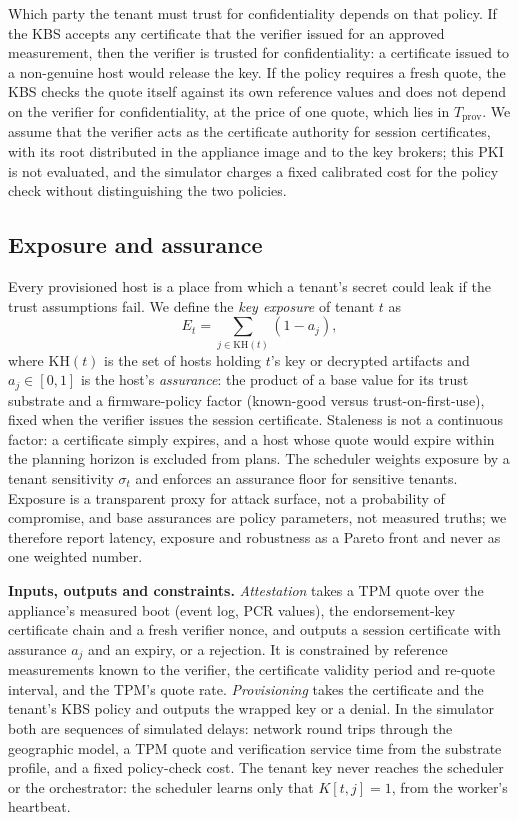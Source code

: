 Which party the tenant must trust for confidentiality depends on that policy. If the KBS accepts any certificate that the verifier issued for an approved measurement, then the verifier is trusted for confidentiality: a certificate issued to a non-genuine host would release the key. If the policy requires a fresh quote, the KBS checks the quote itself against its own reference values and does not depend on the verifier for confidentiality, at the price of one quote, which lies in $T_{\text{prov}}$. We assume that the verifier acts as the certificate authority for session certificates, with its root distributed in the appliance image and to the key brokers; this PKI is not evaluated, and the simulator charges a fixed calibrated cost for the policy check without distinguishing the two policies.

\subsection{Exposure and assurance}
\label{sec:exposure}
Every provisioned host is a place from which a tenant's secret could leak if the trust assumptions fail. We define the \emph{key exposure}
of tenant $t$ as
\begin{equation}
E_t = \sum_{j\in \mathrm{KH}(t)} (1-a_j),
\label{eq:exposure}
\end{equation}
where $\mathrm{KH}(t)$ is the set of hosts holding $t$'s key or decrypted artifacts and $a_j\in[0,1]$ is the host's \emph{assurance}:
the product of a base value for its trust substrate and a firmware-policy factor (known-good versus trust-on-first-use), fixed when the verifier issues
the session certificate. Staleness is not a continuous factor: a certificate simply expires, and a host whose quote would expire within the planning horizon is excluded from plans. The scheduler weights exposure by a tenant sensitivity $\sigma_t$ and
enforces an assurance floor for sensitive tenants. Exposure is a transparent proxy for attack surface, not a probability of compromise,
and base assurances are policy parameters, not measured truths; we therefore report latency, exposure and robustness as a Pareto
front and never as one weighted number.

\textbf{Inputs, outputs and constraints.} \emph{Attestation} takes a TPM quote over the appliance's measured boot (event log, PCR values), the endorsement-key certificate chain and a fresh verifier nonce, and outputs a session certificate with assurance $a_j$ and an expiry, or a rejection. It is constrained by reference measurements known to the verifier, the certificate validity period and re-quote interval, and the TPM's quote rate.
\emph{Provisioning} takes the certificate and the tenant's KBS policy and outputs the wrapped key or a denial. In the simulator both are sequences of simulated delays: network round trips through the geographic model, a TPM quote and verification service time from the substrate profile, and a fixed policy-check cost. The tenant key never reaches the scheduler or the orchestrator: the scheduler learns only that $K[t,j]=1$, from the worker's heartbeat.

